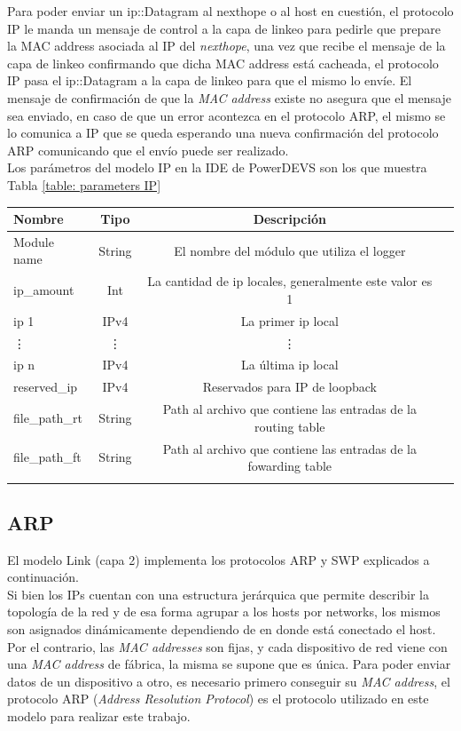 \documentclass[10pt,a4paper]{article}
\begin{document}
Para poder enviar un ip::Datagram al nexthope o al host en cuestión, el protocolo IP le manda un mensaje de control a la capa de linkeo para pedirle que prepare la MAC address asociada al IP del \textit{nexthope}, una vez que recibe el mensaje de la capa de linkeo confirmando que dicha MAC address está cacheada, el protocolo IP pasa el ip::Datagram a la capa de linkeo para que el mismo lo envíe. El mensaje de confirmación de que la \textit{MAC address} existe no asegura que el mensaje sea enviado, en caso de que un error acontezca en el protocolo ARP, el mismo se lo comunica a IP que se queda esperando una nueva confirmación del protocolo ARP comunicando que el envío puede ser realizado. \\

Los parámetros del modelo IP en la IDE de PowerDEVS son los que muestra Tabla \ref{table: parameters IP}

\begin{tabular}{|l|c|c|c|}
  \hline
  Nombre & Tipo & Descripción \\
  \hline
  Module name & String & El nombre del módulo que utiliza el logger \\
  \hline
  ip_amount & Int & La cantidad de ip locales, generalmente este valor es 1 \\
  \hline
  ip 1 & IPv4 & La primer ip local \\
  \hline
  \vdots & \vdots & \vdots \\
  \hline
  ip n & IPv4 & La última ip local \\
  \hline
  reserved_ip & IPv4 & Reservados para IP de loopback \\
  \hline
  file_path_rt & String & Path al archivo que contiene las entradas de la routing table \\
  \hline
  file_path_ft & String & Path al archivo que contiene las entradas de la fowarding table \\
  \hline
  \label{table: parameters UDP}
  \caption{Parametros del modelo UDP}
\end{tabular}

\subsection{ARP}

El modelo Link (capa 2) implementa los protocolos ARP y SWP explicados a continuación. \\

Si bien los IPs cuentan con una estructura jerárquica que permite describir la topología de la red y de esa forma agrupar a los hosts por networks, los mismos son asignados dinámicamente dependiendo de en donde está conectado el host. Por el contrario, las \textit{MAC addresses} son fijas, y cada dispositivo de red viene con una \textit{MAC address} de fábrica, la misma se supone que es única. Para poder enviar datos de un dispositivo a otro, es necesario primero conseguir su \textit{MAC address}, el protocolo ARP (\textit{Address Resolution Protocol}) es el protocolo utilizado en este modelo para realizar este trabajo. \\
\end{document}
